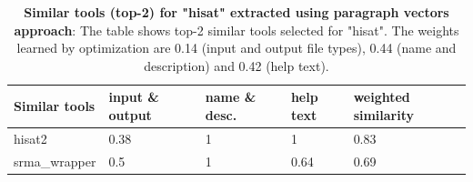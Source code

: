 \begin{table}[ht]
\begin{center}
    \begin{tabular}{|l|l|l|l|l|}
        \hline
        Similar tools   & input \& output & name \& desc. & help text & weighted similarity \\ \hline
        hisat2   & 0.38 & 1 & 1 & 0.83 \\ \hline
        srma\_wrapper & 0.5 & 1 & 0.64 & 0.69 \\ \hline
    \end{tabular}
    \end{center}
    \caption[Similar tools (top-2) for "hisat" extracted using paragraph vectors approach]{\textbf{Similar tools (top-2) for "hisat" extracted using paragraph vectors approach}: The table shows top-2 similar tools selected for "hisat". The weights learned by optimization are 0.14 (input and output file types), 0.44 (name and description) and 0.42 (help text).}
    \label{tab:accuracy}
\end{table}
